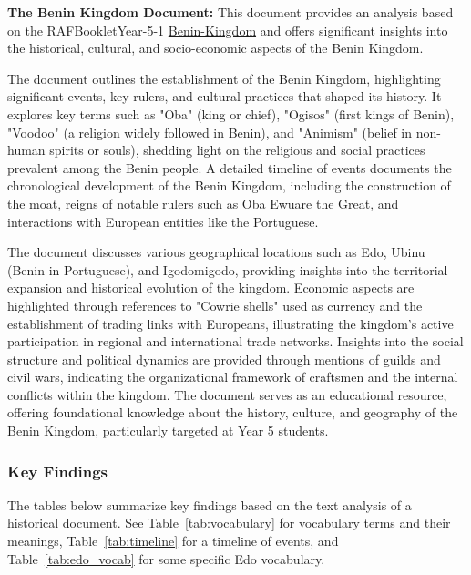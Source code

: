 \textbf{The Benin Kingdom Document:}
This document provides an analysis based on the RAFBookletYear-5-1 \href{https://denhamgreenacademy.e-act.org.uk/wp-content/uploads/sites/5/2020/10/RAFBookletYear-5-1Benin-Kingdom-paper-size-297x21-cmUPDATED.210187322-wecompress.com_.pdf}{Benin-Kingdom} and offers significant insights into the historical, cultural, and socio-economic aspects of the Benin Kingdom.

The document outlines the establishment of the Benin Kingdom, highlighting significant events, key rulers, and cultural practices that shaped its history. It explores key terms such as "Oba" (king or chief), "Ogisos" (first kings of Benin), "Voodoo" (a religion widely followed in Benin), and "Animism" (belief in non-human spirits or souls), shedding light on the religious and social practices prevalent among the Benin people. A detailed timeline of events documents the chronological development of the Benin Kingdom, including the construction of the moat, reigns of notable rulers such as Oba Ewuare the Great, and interactions with European entities like the Portuguese.

The document discusses various geographical locations such as Edo, Ubinu (Benin in Portuguese), and Igodomigodo, providing insights into the territorial expansion and historical evolution of the kingdom. Economic aspects are highlighted through references to "Cowrie shells" used as currency and the establishment of trading links with Europeans, illustrating the kingdom's active participation in regional and international trade networks. Insights into the social structure and political dynamics are provided through mentions of guilds and civil wars, indicating the organizational framework of craftsmen and the internal conflicts within the kingdom. The document serves as an educational resource, offering foundational knowledge about the history, culture, and geography of the Benin Kingdom, particularly targeted at Year 5 students.


\subsubsection{Key Findings}

The tables below summarize key findings based on the text analysis of a historical document. See Table~\ref{tab:vocabulary} for vocabulary terms and their meanings, Table~\ref{tab:timeline} for a timeline of events, and Table~\ref{tab:edo_vocab} for some specific Edo vocabulary.

